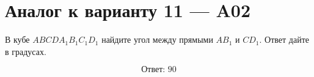 \documentclass[12pt,a4paper]{article}
\begin{document}
\section*{Аналог к варианту 11 — A02}

В кубе \(ABCDA_1B_1C_1D_1\) найдите угол между прямыми \(AB_1\) и \(CD_1\). Ответ дайте в градусах.

\begin{center}
\end{center}

\[
\boxed{\text{Ответ: }90}
\]
\end{document}
